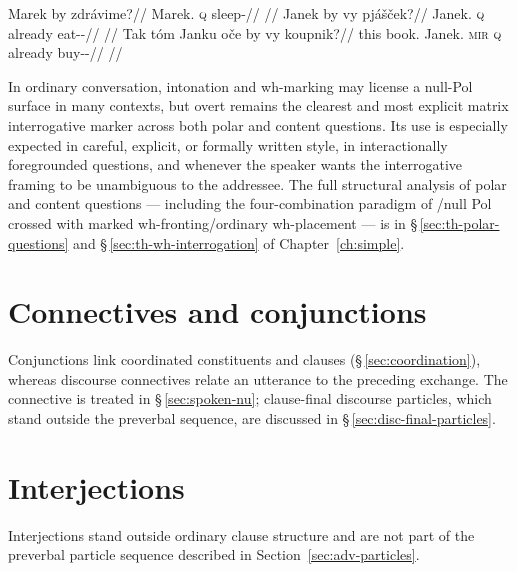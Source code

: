 \pex
\a
\begingl
\gla Marek by zdrávime?//
\glb Marek.\Dir{} \textsc{q} sleep-\Prog{}//
\glft {}//
\endgl
\a
\begingl
\gla Janek by vy pjášček?//
\glb Janek.\Dir{} \textsc{q} already eat-\Antip{}-\Pf{}//
\glft {}//
\endgl
\a
\begingl
\gla Tak tóm Janku oče by vy koupnik?//
\glb this book.\Dir{} Janek.\Trs{} \textsc{mir} \textsc{q} already buy-\Trs{}-\Pf{}//
\glft {}//
\endgl
\xe

\noindent In ordinary conversation, intonation and wh-marking may license a
null-Pol surface in many contexts, but overt  remains the clearest
and most explicit matrix interrogative marker across both polar and content
questions. Its use is especially expected in careful, explicit, or formally
written style, in interactionally foregrounded questions, and whenever the
speaker wants the interrogative framing to be unambiguous to the addressee.
The full structural analysis of polar and content questions --- including the
four-combination paradigm of /null Pol crossed with
marked wh-fronting/ordinary wh-placement --- is in §\,\ref{sec:th-polar-questions} and
§\,\ref{sec:th-wh-interrogation} of Chapter~\ref{ch:simple}.

\section{Connectives and conjunctions}

Conjunctions link coordinated constituents and clauses
(§\,\ref{sec:coordination}), whereas discourse connectives relate an utterance
to the preceding exchange. The connective  is treated in
§\,\ref{sec:spoken-nu}; clause-final discourse particles, which stand outside
the preverbal sequence, are discussed in §\,\ref{sec:disc-final-particles}.

\section{Interjections}

Interjections stand outside ordinary clause structure and are not part of the
preverbal particle sequence described in Section~\ref{sec:adv-particles}.
